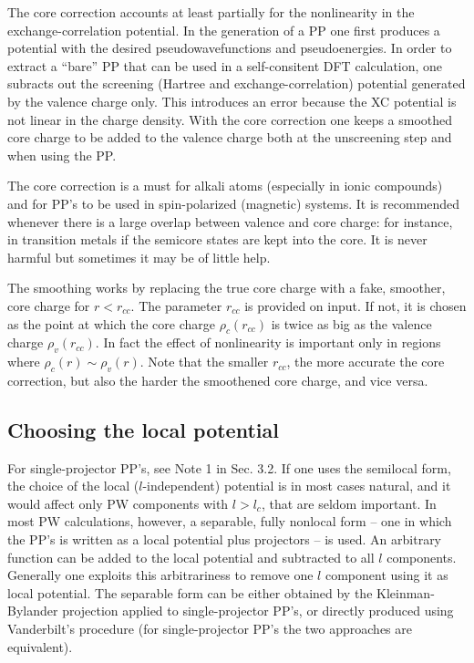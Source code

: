 The core correction accounts at least partially for the nonlinearity
in the exchange-correlation potential. In the generation of a PP one
first produces a potential with the desired pseudowavefunctions and
pseudoenergies. In order to extract a ``bare'' PP that can be used
in a self-consitent DFT calculation, one subracts out the screening 
(Hartree and exchange-correlation) potential generated by the valence 
charge only. This introduces an error because the XC potential is not
linear in the charge density. With the core correction one keeps a  
smoothed core charge to be added to the valence charge both at the
unscreening step and when using the PP.

The core correction is a must for alkali atoms (especially in
ionic compounds) and for PP's to be used in spin-polarized 
(magnetic) systems. It is recommended whenever there is a large 
overlap between valence and core charge: for instance, in transition 
metals if the semicore states are kept into the core. It is never 
harmful but sometimes it may be of little help.

The smoothing works by replacing the true core charge with a fake,
smoother, core charge for $r<r_{cc}$. The parameter $r_{cc}$ is
provided on input. If not, it is chosen as the point at which
the core charge $\rho_c(r_{cc})$ is twice as big as the valence
charge $\rho_v(r_{cc})$. In fact the effect of nonlinearity is 
important only in regions where $\rho_c(r)\sim\rho_v(r)$. Note 
that the smaller $r_{cc}$, the more accurate the core correction, 
but also the harder the smoothened core charge, and vice versa.

\subsection{Choosing the local potential}

For single-projector PP's, see Note 1 in Sec. 3.2. If one uses
the semilocal form, the choice of the local ($l$-independent)
potential is in most cases natural, and it would affect only PW 
components with $l> l_c$, that are seldom important.
In most PW calculations, however, a separable, fully nonlocal form -- 
one in which the PP's is written as a local potential plus projectors -- 
is used.
An arbitrary function can be added to the local potential and 
subtracted to all $l$ components. Generally one exploits this 
arbitrariness to remove one $l$ component using it as local potential.
The separable form can be either obtained by the Kleinman-Bylander
projection \cite{KB} applied to single-projector PP's, or directly 
produced using Vanderbilt's procedure \cite{van} (for single-projector
PP's the two approaches are equivalent).

